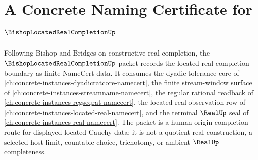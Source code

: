 \chapter{A Concrete Naming Certificate for $\BishopLocatedRealCompletionUp$}
\label{ch:concrete-instances-bishop-located-real-completion-namecert}

Following Bishop and Bridges on constructive real completion, the $\BishopLocatedRealCompletionUp$ packet records the located-real completion boundary as finite NameCert data. It consumes the dyadic tolerance core of \autoref{ch:concrete-instances-dyadicratcore-namecert}, the finite stream-window surface of \autoref{ch:concrete-instances-streamname-namecert}, the regular rational readback of \autoref{ch:concrete-instances-regseqrat-namecert}, the located-real observation row of \autoref{ch:concrete-instances-located-real-namecert}, and the terminal $\RealUp$ seal of \autoref{ch:concrete-instances-real-namecert}. The packet is a human-origin completion route for displayed located Cauchy data; it is not a quotient-real construction, a selected host limit, countable choice, trichotomy, or ambient $\RealUp$ completeness.

